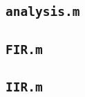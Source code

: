 \documentclass{article}
\begin{document}
\subsection*{\texttt{analysis.m}}


\subsection*{\texttt{FIR.m}}


\subsection*{\texttt{IIR.m}}


% 

% 

\end{document}
